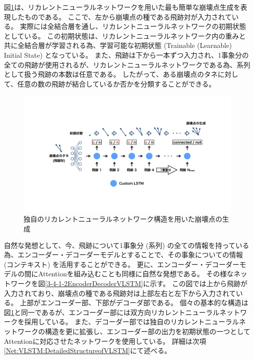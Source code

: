 図\ref{3-4-1-1SimpleVLSTM}は、リカレントニューラルネットワークを用いた最も簡単な崩壊点生成を表現したものである。
ここで、左から崩壊点の種である飛跡対が入力されている。
実際には全結合層を通し、リカレントニューラルネットワークの初期状態としている。
この初期状態は、リカレントニューラルネットワーク内の重みと共に全結合層が学習される為、学習可能な初期状態 (Trainable (Learnable) Initial State) となっている。
また、飛跡は下から一本ずつ入力され、1事象分の全ての飛跡が使用されるが、リカレントニューラルネットワークである為、系列として扱う飛跡の本数は任意である。
したがって、ある崩壊点のタネに対して、任意の数の飛跡が結合しているか否かを分類することができる。

\begin{figure}[h]
 \centering
 \includegraphics[trim = 0 80 0 0, width=1.0\textwidth]{Figure/3Networks/3-4-1-1SimpleVLSTM.png}
 \caption{独自のリカレントニューラルネットワーク構造を用いた崩壊点の生成}
 \label{3-4-1-1SimpleVLSTM}
\end{figure}

自然な発想として、今、飛跡について1事象分 (系列) の全ての情報を持っている為、エンコーダー・デコーダーモデルとすることで、その事象についての情報 (コンテキスト) を活用することができる。
更に、エンコーダー・デコーダーモデルの間にAttentionを組み込むことも同様に自然な発想である。
その様なネットワークを図\ref{3-4-1-2EncoderDecoderVLSTM}に示す。
この図では上から飛跡が入力されており、崩壊点の種である飛跡対は上部左右と左下から入力されている。
上部がエンコーダー部、下部がデコーダ部である。
個々の基本的な構造は図\ref{3-4-1-1SimpleVLSTM}と同一であるが、エンコーダー部には双方向リカレントニューラルネットワークを採用している。
また、デコーダー部では独自のリカレントニューラルネットワークの構造を更に拡張し、エンコーダー部の出力を初期状態の一つとしてAttentionに対応させたネットワークを使用している。
詳細は次項\ref{Net:VLSTM:DetailedStructureofVLSTM}にて述べる。

